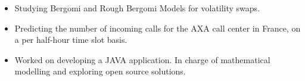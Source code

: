 

\begin{itemize}
\item Studying Bergomi and Rough Bergomi Models for volatility swaps.
\end{itemize}

\divider

\begin{itemize}
\item Predicting the number of incoming calls for the AXA call center in France, on a per half-hour time slot basis.
\end{itemize}

\divider

\begin{itemize}
\item Worked on developing a JAVA application. In charge of mathematical modelling and exploring open source solutions.
\end{itemize}